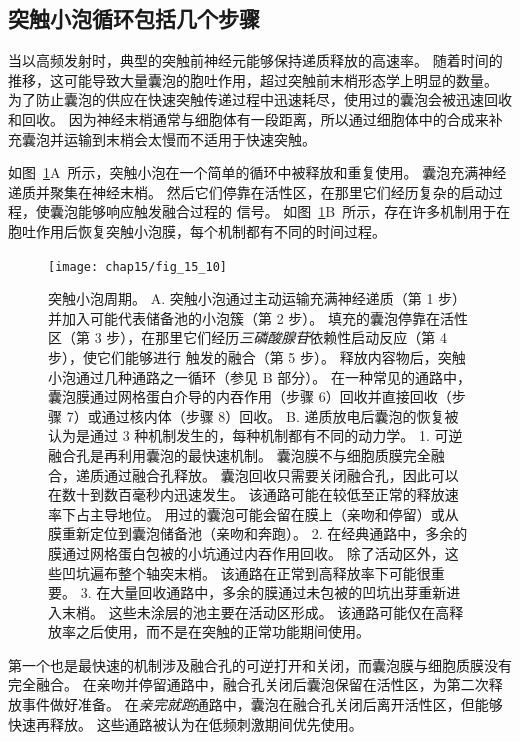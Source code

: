 \subsection{突触小泡循环包括几个步骤}

当以高频发射时，典型的突触前神经元能够保持递质释放的高速率。
随着时间的推移，这可能导致大量囊泡的胞吐作用，超过突触前末梢形态学上明显的数量。
为了防止囊泡的供应在快速突触传递过程中迅速耗尽，使用过的囊泡会被迅速回收和回收。
因为神经末梢通常与细胞体有一段距离，所以通过细胞体中的合成来补充囊泡并运输到末梢会太慢而不适用于快速突触。


如图~\ref{fig:15_10}A~所示，突触小泡在一个简单的循环中被释放和重复使用。
囊泡充满神经递质并聚集在神经末梢。
然后它们停靠在活性区，在那里它们经历复杂的启动过程，使囊泡能够响应触发融合过程的  信号。
如图~\ref{fig:15_10}B~所示，存在许多机制用于在胞吐作用后恢复突触小泡膜，每个机制都有不同的时间过程。


\begin{figure}[htbp]
	\centering
	\texttt{[image: chap15/fig\_15\_10]}
	\caption{突触小泡周期。
		A. 突触小泡通过主动运输充满神经递质（第 1 步）并加入可能代表储备池的小泡簇（第 2 步）。
		填充的囊泡停靠在活性区（第 3 步），在那里它们经历\textit{三磷酸腺苷}依赖性启动反应（第 4 步），使它们能够进行  触发的融合（第 5 步）。
		释放内容物后，突触小泡通过几种通路之一循环（参见 B 部分）。
		在一种常见的通路中，囊泡膜通过网格蛋白介导的内吞作用（步骤 6）回收并直接回收（步骤 7）或通过核内体（步骤 8）回收。
		B. 递质放电后囊泡的恢复被认为是通过 3 种机制发生的，每种机制都有不同的动力学。
		1. 可逆融合孔是再利用囊泡的最快速机制。
		囊泡膜不与细胞质膜完全融合，递质通过融合孔释放。
		囊泡回收只需要关闭融合孔，因此可以在数十到数百毫秒内迅速发生。
		该通路可能在较低至正常的释放速率下占主导地位。
		用过的囊泡可能会留在膜上（亲吻和停留）或从膜重新定位到囊泡储备池（亲吻和奔跑）。
		2. 在经典通路中，多余的膜通过网格蛋白包被的小坑通过内吞作用回收。
		除了活动区外，这些凹坑遍布整个轴突末梢。
		该通路在正常到高释放率下可能很重要。
		3. 在大量回收通路中，多余的膜通过未包被的凹坑出芽重新进入末梢。
		这些未涂层的池主要在活动区形成。
		该通路可能仅在高释放率之后使用，而不是在突触的正常功能期间使用\cite{schweizer1995vesicle}。}
	\label{fig:15_10}
\end{figure}


第一个也是最快速的机制涉及融合孔的可逆打开和关闭，而囊泡膜与细胞质膜没有完全融合。
在亲吻并停留通路中，融合孔关闭后囊泡保留在活性区，为第二次释放事件做好准备。
在\textit{亲完就跑}通路中，囊泡在融合孔关闭后离开活性区，但能够快速再释放。
这些通路被认为在低频刺激期间优先使用。


